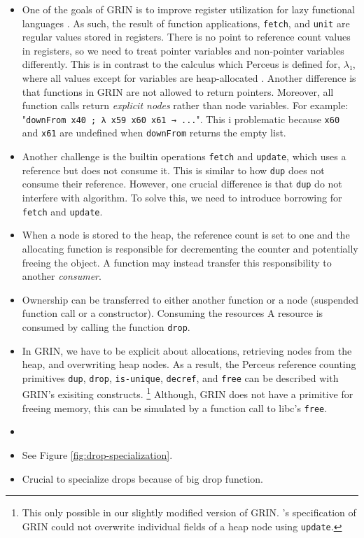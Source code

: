 \documentclass[10pt, twocolumn]{article}
\begin{document}
\begin{itemize}
\item
One of the goals of GRIN is to improve register utilization for lazy functional languages \citep{boquist1999}.
As such, the result of function applications, \lstinline{fetch}, and \lstinline{unit} are regular values stored in registers.
There is no point to reference count values in registers, so we need to treat pointer variables and non-pointer variables differently.
This is in contrast to the calculus which Perceus is defined for, $λ₁$, where all values except for variables are heap-allocated \citep{reinking2021}.
Another difference is that functions in GRIN are not allowed to return pointers. 
Moreover, all function calls return \emph{explicit nodes} rather than node variables. 
For example: "\lstinline{downFrom x40 ; λ x59 x60 x61 → ...}".
This i problematic because \lstinline{x60} and \lstinline{x61} are undefined when \lstinline{downFrom} returns the empty list.

\item
Another challenge is the builtin operations \lstinline{fetch} and \lstinline{update}, which uses a reference but does not consume it.
This is similar to how \lstinline{dup} does not consume their reference.
However, one crucial difference is that \lstinline{dup} do not interfere with algorithm.
To solve this, we need to introduce borrowing for \lstinline{fetch} and \lstinline{update}.
\item
When a node is stored to the heap, the reference count is set to one and the allocating function is responsible for decrementing the counter and potentially freeing the object.
A function may instead transfer this responsibility to another \emph{consumer}. 
\item
Ownership can be transferred to either another function or a node (suspended function call or a constructor).
Consuming the resources 
A resource is consumed by calling the function \lstinline{drop}.
\item
In GRIN, we have to be explicit about allocations, retrieving nodes from the heap, and overwriting heap nodes.
As a result, the Perceus reference counting primitives \texttt{dup}, \texttt{drop}, \texttt{is-unique}, \texttt{decref}, and \texttt{free} 
can be described with GRIN's exisiting constructs.
\footnote{This only possible in our slightly modified version of GRIN. 
\citeauthor{boquist1999}'s specification of GRIN could not overwrite individual fields of a heap node using \texttt{update}.}
Although, GRIN does not have a primitive for freeing memory, this can be simulated by a function call 
to libc's \texttt{free}.
\item
\item 
See Figure \ref{fig:drop-specialization}.
\item 
Crucial to specialize drops because of big drop function.
\end{itemize}
 
\end{document}
